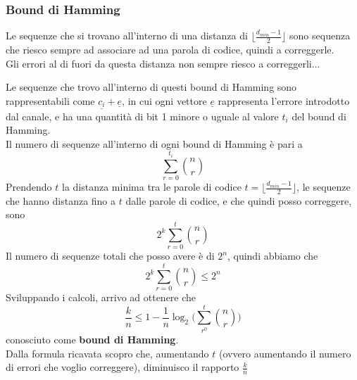 \documentclass{article}
\begin{document}
\subsubsection{Bound di Hamming}
Le sequenze che si trovano all'interno di una distanza di $\lfloor\frac{d_{min}-1}{2}\rfloor$ sono sequenza che riesco sempre ad associare ad una parola di codice, quindi a correggerle.\\
Gli errori al di fuori da questa distanza non sempre riesco a correggerli...
\begin{center}
\end{center}
Le sequenze che trovo all'interno di questi bound di Hamming sono rappresentabili come $\underline{c_i}+\underline{e}$, in cui ogni vettore $\underline{e}$ rappresenta l'errore introdotto dal canale, e ha una quantità di bit 1 minore o uguale al valore $t_i$ del bound di Hamming.\\
Il numero di sequenze all'interno di ogni bound di Hamming è pari a $$\sum_{r=0}^{t_i}{n\choose r}$$
Prendendo $t$ la distanza minima tra le parole di codice $t=\lfloor\frac{d_{min}-1}{2}\rfloor$, le sequenze che hanno distanza fino a $t$ dalle parole di codice, e che quindi posso correggere, sono $$2^k\sum_{r=0}^t{n\choose r}$$
Il numero di sequenze totali che posso avere è di $2^n$, quindi abbiamo che $$2^k\sum_{r=0}^t{n\choose r}\leq 2^n$$
Sviluppando i calcoli, arrivo ad ottenere che $$\frac{k}{n}\leq1-\frac{1}{n}\log_2\biggl(\sum_{r^0}^t{n\choose r}\biggl)$$ conosciuto come \textbf{bound di Hamming}.\\
Dalla formula ricavata scopro che, aumentando $t$ (ovvero aumentando il numero di errori che voglio correggere), diminuisco il rapporto $\frac{k}{n}$\\
\end{document}
